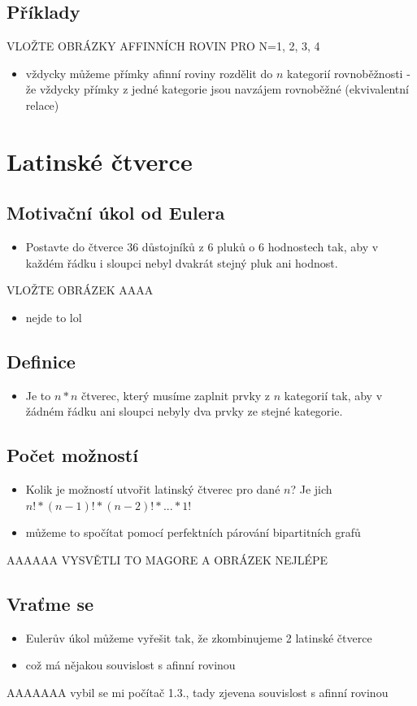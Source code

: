 \documentclass{article}
\begin{document}
\subsection{Příklady}
VLOŽTE OBRÁZKY AFFINNÍCH ROVIN PRO N=1, 2, 3, 4
\begin{itemize}
  \item vždycky můžeme přímky afinní roviny rozdělit do $n$ kategorií rovnoběžnosti - že vždycky přímky z jedné kategorie jsou navzájem rovnoběžné (ekvivalentní relace)
\end{itemize}

\section{Latinské čtverce}
\subsection{Motivační úkol od Eulera}
\begin{itemize}
  \item Postavte do čtverce 36 důstojníků z 6 pluků o 6 hodnostech tak, aby v každém řádku i sloupci nebyl dvakrát stejný pluk ani hodnost.
\end{itemize}
VLOŽTE OBRÁZEK AAAA
\begin{itemize}
  \item nejde to lol
\end{itemize}
\subsection{Definice}
\begin{itemize}
  \item Je to $n*n$ čtverec, který musíme zaplnit prvky z $n$ kategorií tak, aby v žádném řádku ani sloupci nebyly dva prvky ze stejné kategorie.
\end{itemize}
\subsection{Počet možností}
\begin{itemize}
  \item Kolik je možností utvořit latinský čtverec pro dané $n$? Je jich $n!*(n-1)!*(n-2)!*...*1!$
  \item můžeme to spočítat pomocí perfektních párování bipartitních grafů
\end{itemize}
AAAAAA VYSVĚTLI TO MAGORE A OBRÁZEK NEJLÉPE
\subsection{Vraťme se}
\begin{itemize}
  \item Eulerův úkol můžeme vyřešit tak, že zkombinujeme 2 latinské čtverce
  \item což má nějakou souvislost s afinní rovinou
\end{itemize}
AAAAAAA vybil se mi počítač 1.3., tady zjevena souvislost s afinní rovinou
\end{document}
